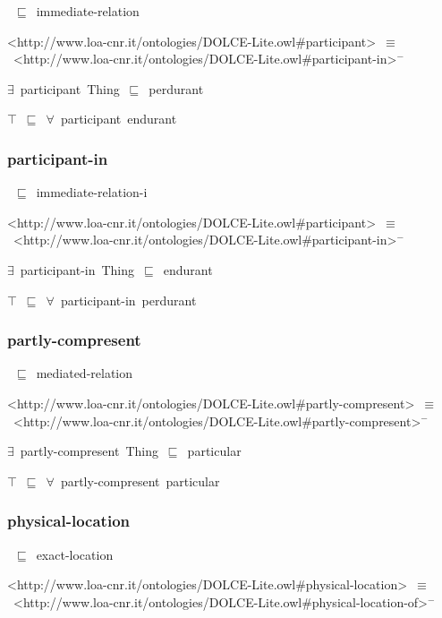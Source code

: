\documentclass{article}
\begin{document}
~\ensuremath{\sqsubseteq}~immediate-relation

<http://www.loa-cnr.it/ontologies/DOLCE-Lite.owl#participant>~\ensuremath{\equiv}~<http://www.loa-cnr.it/ontologies/DOLCE-Lite.owl#participant-in>\ensuremath{^-}

\ensuremath{\exists}~participant~Thing~\ensuremath{\sqsubseteq}~perdurant

\ensuremath{\top}~\ensuremath{\sqsubseteq}~\ensuremath{\forall}~participant~endurant

\subsubsection*{participant-in}

~\ensuremath{\sqsubseteq}~immediate-relation-i

<http://www.loa-cnr.it/ontologies/DOLCE-Lite.owl#participant>~\ensuremath{\equiv}~<http://www.loa-cnr.it/ontologies/DOLCE-Lite.owl#participant-in>\ensuremath{^-}

\ensuremath{\exists}~participant-in~Thing~\ensuremath{\sqsubseteq}~endurant

\ensuremath{\top}~\ensuremath{\sqsubseteq}~\ensuremath{\forall}~participant-in~perdurant

\subsubsection*{partly-compresent}

~\ensuremath{\sqsubseteq}~mediated-relation

<http://www.loa-cnr.it/ontologies/DOLCE-Lite.owl#partly-compresent>~\ensuremath{\equiv}~<http://www.loa-cnr.it/ontologies/DOLCE-Lite.owl#partly-compresent>\ensuremath{^-}

\ensuremath{\exists}~partly-compresent~Thing~\ensuremath{\sqsubseteq}~particular

\ensuremath{\top}~\ensuremath{\sqsubseteq}~\ensuremath{\forall}~partly-compresent~particular

\subsubsection*{physical-location}

~\ensuremath{\sqsubseteq}~exact-location

<http://www.loa-cnr.it/ontologies/DOLCE-Lite.owl#physical-location>~\ensuremath{\equiv}~<http://www.loa-cnr.it/ontologies/DOLCE-Lite.owl#physical-location-of>\ensuremath{^-}
\end{document}
